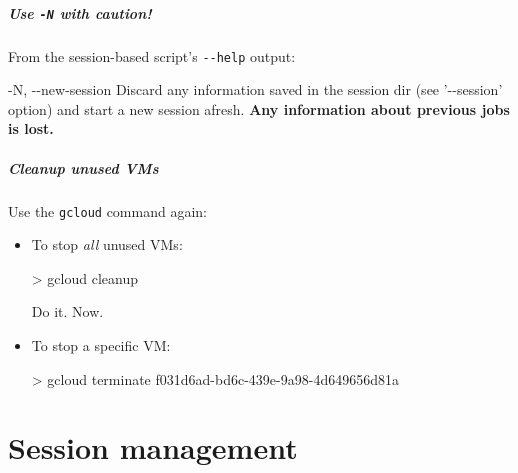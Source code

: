 \documentclass[english,serif,mathserif,usenames,dvipsnames]{beamer}
\begin{document}
\begin{frame}[fragile]
  \frametitle{Use \texttt{-N} with caution!}

  \small
  From the session-based script's \texttt{-{}-help} output:
\begin{semiverbatim}
-N, -{}-new-session
  Discard any information saved in the session dir
  (see '-{}-session' option) and start a new session
  afresh. {\bf Any information about previous jobs is lost.}
\end{semiverbatim}

\end{frame}







\begin{frame}
  \frametitle{Cleanup unused VMs}

  Use the \texttt{gcloud} command again:

  \begin{itemize}
  \item To stop \emph{all} unused VMs:
\begin{semiverbatim}
    > gcloud cleanup
\end{semiverbatim}

    \begin{exercise}
      Do it. Now.
    \end{exercise}

  \item To stop a specific VM:
\begin{semiverbatim}
    > gcloud terminate f031d6ad-bd6c-439e-9a98-4d649656d81a
\end{semiverbatim}
  \end{itemize}
\end{frame}


\part{Session management}
\end{document}
